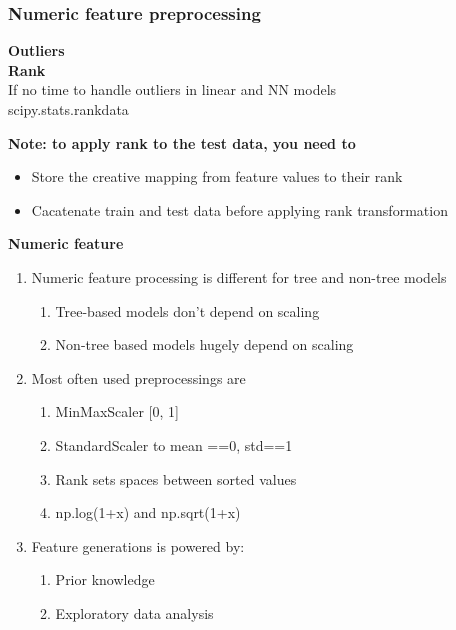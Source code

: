 \documentclass[11pt, twoside]{article}   	%
\begin{document}
%
\subsubsection{Numeric feature preprocessing}
\textbf{Outliers}
\\\textbf{Rank}
\\\indent If no time to handle outliers in linear and NN models 
\\\indent scipy.stats.rankdata

\textbf {Note: to apply rank to the test data, you need to}
\begin{itemize}
  \item Store the creative mapping from feature values to their rank
  \item Cacatenate train and test data before applying rank transformation 
\end{itemize}

\noindent \textbf{Numeric feature}
\renewcommand{\labelenumii}{\alph{enumii}}
\begin{enumerate}
  \item Numeric feature processing is different for tree and non-tree models
    \begin{enumerate}
      \item Tree-based models don't depend on scaling
      \item Non-tree based models hugely depend on scaling
    \end{enumerate}
    
      \item Most often used preprocessings are
        \begin{enumerate}
           \item MinMaxScaler [0, 1]
           \item StandardScaler to mean ==0, std==1 
           \item Rank sets spaces between sorted values
           \item np.log(1+x) and np.sqrt(1+x)
    \end{enumerate}
    

      \item Feature generations is powered by: 
        \begin{enumerate}
           \item Prior knowledge 
           \item Exploratory data analysis
    \end{enumerate}
    
  \end{enumerate}
%
\end{document}
